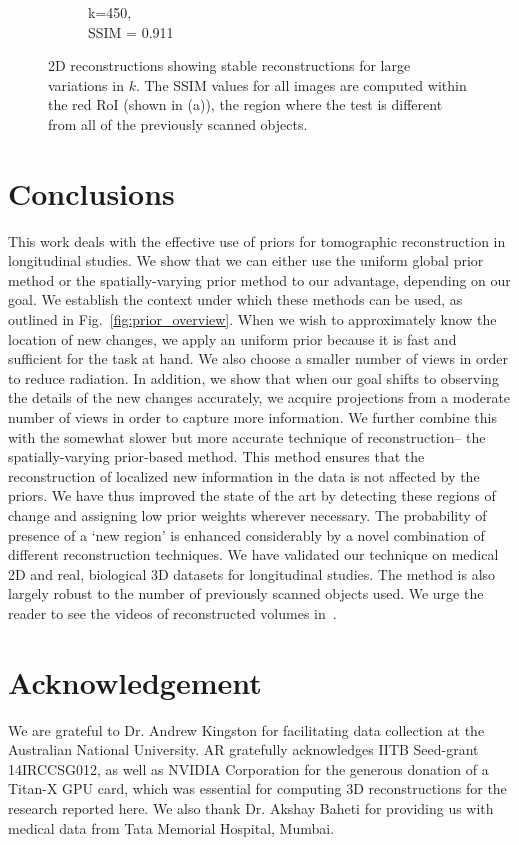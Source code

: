 \documentclass[journal]{IEEEtran}
\begin{document}
\begin{figure}[h]
\begin{subfigure}[b]{0.24\linewidth}
        \caption{k=450,\\ SSIM = 0.911}
     \end{subfigure}
    \caption{2D reconstructions showing stable reconstructions for large variations in $k$. The SSIM values for all images are computed within the red RoI (shown in (a)), the region where the test is different from all of the previously scanned objects.}
\label{fig:reconstructions_as_k_varies}
\end{figure}


\section{Conclusions}
\label{sec:conclusions}
This work deals with the effective use of priors for tomographic
reconstruction in longitudinal studies. We show that we can either use
the uniform global prior method or the spatially-varying prior method
to our advantage, depending on our goal. We establish the context
under which these methods can be used, as outlined in
Fig.~\ref{fig:prior_overview}. When we wish to approximately know the
location of new changes, we apply an uniform prior because it is fast
and sufficient for the task at hand. We also choose a smaller number
of views in order to reduce radiation. In addition, we show that when
our goal shifts to observing the details of the new changes
accurately, we acquire projections from a moderate number of views in
order to capture more information. We further combine this with the
somewhat slower but more accurate technique of reconstruction-- the
spatially-varying prior-based method. This method ensures that the
reconstruction of localized new information in the data is not
affected by the priors. We have thus improved the state of the art by
detecting these regions of change and assigning low prior weights
wherever necessary. The probability of presence of a `new region' is
enhanced considerably by a novel combination of different
reconstruction techniques.  We have validated our technique on medical
2D and real, biological 3D datasets for longitudinal studies. The
method is also largely robust to the number of previously scanned
objects used. We urge the reader to see the videos of reconstructed
volumes in~\cite{supp_paper}.

\section{Acknowledgement}
We are grateful to Dr. Andrew Kingston for facilitating data
collection at the Australian National University. AR gratefully
acknowledges IITB Seed-grant 14IRCCSG012, as well as NVIDIA
Corporation for the generous donation of a Titan-X GPU card, which was
essential for computing 3D reconstructions for the research reported
here. We also thank Dr. Akshay Baheti for providing us with medical
data from Tata Memorial Hospital, Mumbai.
{%
}
\end{document}
